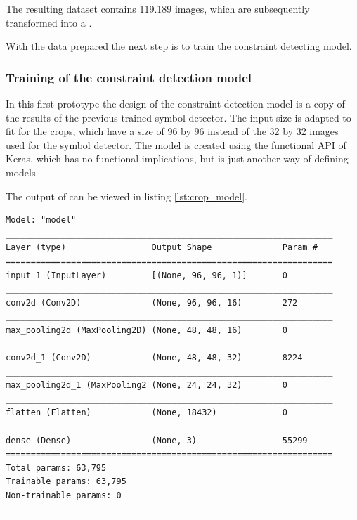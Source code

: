 The resulting dataset contains 119.189 images, which are subsequently transformed into a .


With the data prepared the next step is to train the constraint detecting model.

\subsubsection{Training of the constraint detection model}

In this first prototype the design of the constraint detection model is a copy of the results of the previous trained symbol detector.
The input size is adapted to fit for the crops, which have a size of 96 by 96 instead of the 32 by 32 images used for the symbol detector.
The model is created using the functional API of Keras, which has no functional implications, but is just another way of defining models.

The output of  can be viewed in listing \ref{lst:crop_model}.
\begin{lstlisting}[label={lst:crop_model}, caption={Summary of Constraint Detector.}]
Model: "model"
_________________________________________________________________
Layer (type)                 Output Shape              Param #   
=================================================================
input_1 (InputLayer)         [(None, 96, 96, 1)]       0         
_________________________________________________________________
conv2d (Conv2D)              (None, 96, 96, 16)        272       
_________________________________________________________________
max_pooling2d (MaxPooling2D) (None, 48, 48, 16)        0         
_________________________________________________________________
conv2d_1 (Conv2D)            (None, 48, 48, 32)        8224      
_________________________________________________________________
max_pooling2d_1 (MaxPooling2 (None, 24, 24, 32)        0         
_________________________________________________________________
flatten (Flatten)            (None, 18432)             0         
_________________________________________________________________
dense (Dense)                (None, 3)                 55299     
=================================================================
Total params: 63,795
Trainable params: 63,795
Non-trainable params: 0
_________________________________________________________________    
\end{lstlisting}

